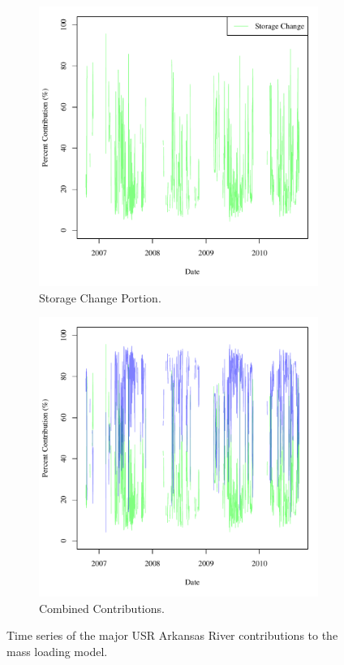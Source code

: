 \begin{figure}[htbp]
\begin{subfigure}{0.5\textwidth}
		\includegraphics[width=\tableCustomSize]{"Figures/Results_USR/Stochastic/M Mass Contrib 2"}
		\caption{Storage Change Portion.}
	\end{subfigure}
	\tablevspace
	\begin{subfigure}{0.5\textwidth}
		\centering
		\includegraphics[width=\tableCustomSize]{"Figures/Results_USR/Stochastic/M Mass Contrib 3"}
		\caption{Combined Contributions.}
	\end{subfigure}
	\caption[Time series of the major USR Arkansas River contributions to the mass loading model.]{Time series of the major USR Arkansas River contributions to the mass loading model.}
	\label{fig:USRMassContrib}
\end{figure}

